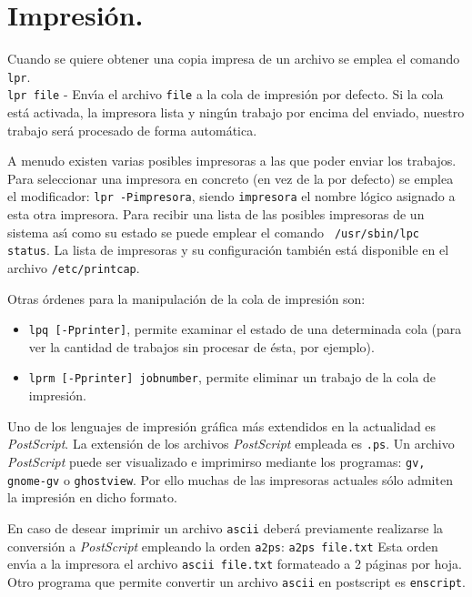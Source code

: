 \section{Impresi{\'o}n.} 
\label{impresion}

Cuando se quiere obtener una copia impresa de un archivo se emplea el comando \verb+lpr+.\\

\verb+lpr file+ - Env{\'\i}a el archivo \verb+file+ a la cola de impresi{\'o}n
por defecto.  Si la cola est{\'a} activada, la impresora lista y ning{\'u}n
trabajo por encima del enviado, nuestro trabajo ser{\'a} procesado de
forma autom{\'a}tica.

A menudo existen varias posibles impresoras a las que poder enviar los
trabajos. Para seleccionar una impresora en concreto (en vez de la por
defecto) se emplea el modificador: \verb+lpr -Pimpresora+, siendo
\verb+impresora+ el nombre l{\'o}gico asignado a esta otra
impresora. Para recibir una lista de las posibles impresoras
  de un sistema as{\'\i} como su estado se puede emplear el comando {\tt
    /usr/sbin/lpc status}. La lista de impresoras y su
configuraci\'on tambi\'en est\'a disponible en el archivo
\verb+/etc/printcap+. 

Otras {\'o}rdenes para la manipulaci{\'o}n de la cola de impresi{\'o}n son:

\begin{itemize}

\item \verb+lpq [-Pprinter]+, permite examinar el estado de una
  determinada cola (para ver la cantidad de trabajos sin procesar de
  {\'e}sta, por ejemplo).
  
\item \verb+lprm [-Pprinter] jobnumber+, permite eliminar un trabajo
  de la cola de impresi{\'o}n.

\end{itemize}

Uno de los lenguajes de impresi{\'o}n gr{\'a}fica m{\'a}s extendidos en la
actualidad es {\it PostScript}. La extensi{\'o}n de los archivos {\it
  PostScript\/} empleada es \verb+.ps+. Un archivo {\it PostScript} puede ser
visualizado e imprimirso mediante los programas: \verb+gv, gnome-gv+ o
\verb+ghostview+.
 Por ello muchas de las impresoras actuales
s{\'o}lo admiten la impresi{\'o}n en dicho formato. 

En caso de desear imprimir
un archivo {\tt ascii} deber{\'a} previamente realizarse la conversi{\'o}n a
{\it PostScript} empleando la orden \verb+a2ps+: \verb+a2ps file.txt+
Esta orden env{\'\i}a a la impresora el archivo {\tt ascii file.txt}
formateado a 2 p{\'a}ginas por hoja. Otro programa que permite
convertir un archivo {\tt ascii} en postscript es \verb+enscript+. 


